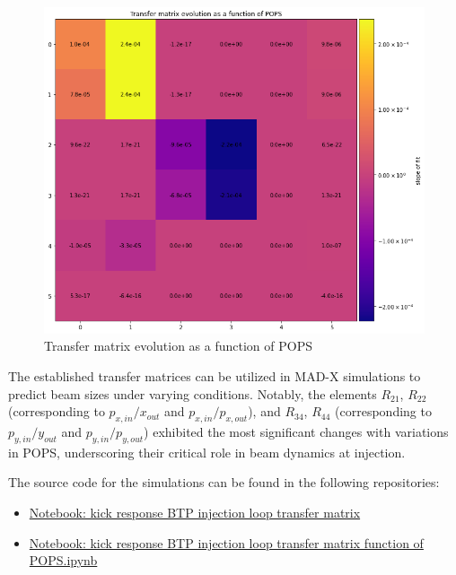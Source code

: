 \begin{figure}[H]
\centering
\includegraphics[width=1.0\textwidth]{02_Simulation/images/transfer_matrix_POPS.png}
\caption{Transfer matrix evolution as a function of POPS}
\label{fig:transfer_matrix_pops}
\end{figure}

The established transfer matrices can be utilized in MAD-X simulations to predict beam sizes under varying conditions. Notably, the elements \(R_{21}\), \(R_{22}\) (corresponding to \(p_{x,in}/x_{out}\) and \(p_{x,in}/p_{x,out}\)), and \(R_{34}\), \(R_{44}\) (corresponding to \(p_{y,in}/y_{out}\) and \(p_{y,in}/p_{y,out}\)) exhibited the most significant changes with variations in POPS, underscoring their critical role in beam dynamics at injection.


The source code for the simulations can be found in the following repositories:
\begin{itemize}
  \item \href{https://gitlab.cern.ch/eljohnso/acc-models-tls-eliott-fork/-/blob/EliottBranch/ps_injection/kick_response_injection_tracking/kick_response_BTP_injection_loop_transfer_matrix.ipynb}{Notebook: kick response BTP injection loop transfer matrix}
  \item \href{https://gitlab.cern.ch/eljohnso/acc-models-tls-eliott-fork/-/blob/EliottBranch/ps_injection/kick_response_injection_tracking/kick_response_BTP_injection_loop_transfer_matrix_function_of_POPS.ipynb}{Notebook: kick response BTP injection loop transfer matrix function of POPS.ipynb}
\end{itemize}



